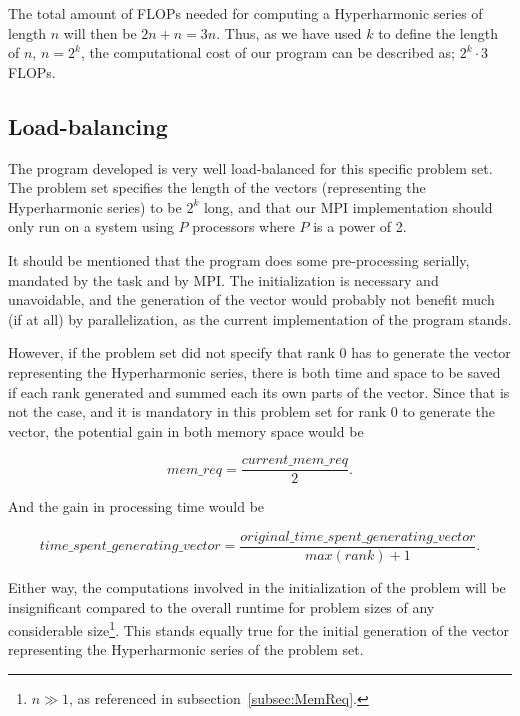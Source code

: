 \documentclass[fontsize=11pt,paper=a4,titlepage]{report}
\begin{document}
The total amount of FLOPs needed for computing a Hyperharmonic series of length
$n$ will then be $2n + n = 3n$. Thus, as we have used $k$ to define the length
of $n$, $n=2^k$, the computational cost of our program can be described as;
$2^k\cdot 3$ FLOPs.

\subsection{Load-balancing}

The program developed is very well load-balanced for this specific problem set.
The problem set specifies the length of the vectors (representing the
Hyperharmonic series) to be $2^k$ long, and that our MPI implementation should
only run on a system using $P$ processors where $P$ is a power of 2.

It should be mentioned that the program does some pre-processing serially,
mandated by the task and by MPI. The initialization is necessary and
unavoidable, and the generation of the vector would probably not benefit much
(if at all) by parallelization, as the current implementation of the program
stands.

However, if the problem set did not specify that rank 0 has to generate the
vector representing the Hyperharmonic series, there is both time and space to be
saved if each rank generated and  summed each its own parts of the vector. Since
that is not the case, and it is mandatory in this problem set for rank 0 to
generate the vector, the potential gain in both memory space would be

\begin{equation}
	mem\_req = \frac {current\_mem\_req}{2}.
	\label{eq:mem-req}
\end{equation}

And the gain in processing time would be

\begin{equation}
	time\_spent\_generating\_vector = \frac
{original\_time\_spent\_generating\_vector} {max(rank)+1}.
	\label{eq:time-req}
\end{equation}

Either way, the computations involved in the initialization of the
problem will be insignificant compared to the overall runtime for problem sizes
of any considerable size\footnote{$n \gg 1$, as referenced in
subsection~\ref{subsec:MemReq}.}. This stands equally true for the initial
generation of the vector representing the Hyperharmonic series of the problem
set.
\end{document}
